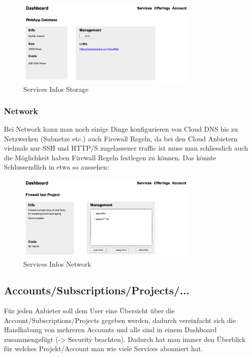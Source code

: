 \begin{figure}[!htbp]
\includegraphics[width=0.8\textwidth]{./03_Analyse/03_Dashboard/images/service_info_storage}
\caption{Services Infos Storage}
\end{figure}

\subsubsection{Network}
Bei Network kann man noch einige Dinge konfigurieren von Cloud DNS bis zu 
Netzwerken (Subnetze etc.) auch Firewall Regeln, da bei den Cloud Anbietern 
vielmals nur SSH und HTTP/S zugelassener traffic ist muss man schliesslich auch 
die Möglichkeit haben Firewall Regeln festlegen zu können.
Das könnte Schlussendlich in etwa so aussehen:

\begin{figure}[!htbp]
  \includegraphics[width=0.8\textwidth]{./03_Analyse/03_Dashboard/images/service_info_network}
  \caption{Services Infos Network}
\end{figure}

\newpage

\subsection{Accounts/Subscriptions/Projects/...}
Für jeden Anbieter soll dem User eine Übersicht über die 
Account/Subscriptions/Projects gegeben werden, dadurch vereinfacht sich die 
Handhabung von mehreren Accounts und alle sind in einem Dashboard zusammengefügt 
(-> Security beachten).
Dadurch hat man immer den Überblick für welches Projekt/Account man wie viele 
Services abonniert hat.

